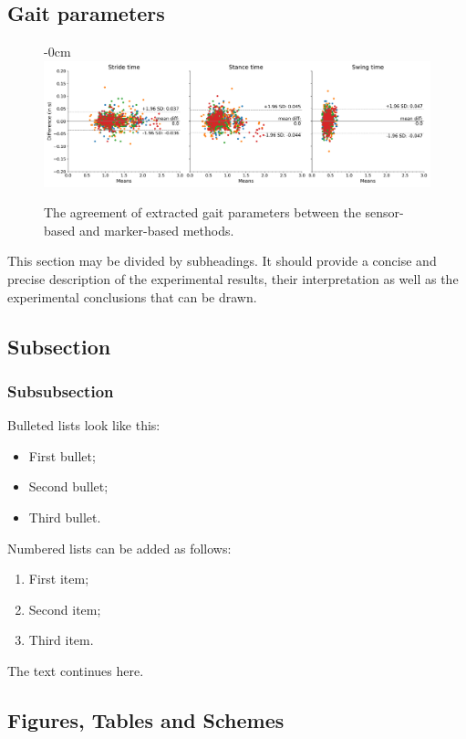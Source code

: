 \documentclass[sensors,article,submit,pdftex,moreauthors]{Definitions/mdpi}
\begin{document}
\subsection{Gait parameters}
\begin{figure}[H]
	\begin{adjustwidth}{-\extralength}{0cm}
		\centering
		\includegraphics[width=13.5cm]{fig/bland_altman_plots_stride_params.png}
	\end{adjustwidth}
	\caption{The agreement of extracted gait parameters between the sensor-based and marker-based methods.\label{fig:gait_parameters_bland_altman_plots}}
\end{figure}  


This section may be divided by subheadings. It should provide a concise and precise description of the experimental results, their interpretation as well as the experimental conclusions that can be drawn.
\subsection{Subsection}
\subsubsection{Subsubsection}

Bulleted lists look like this:
\begin{itemize}
\item	First bullet;
\item	Second bullet;
\item	Third bullet.
\end{itemize}

Numbered lists can be added as follows:
\begin{enumerate}
\item	First item; 
\item	Second item;
\item	Third item.
\end{enumerate}

The text continues here. 

\subsection{Figures, Tables and Schemes}
\end{document}

